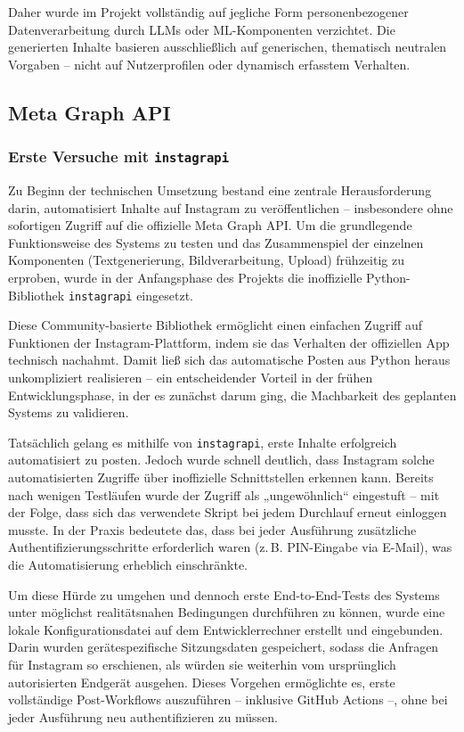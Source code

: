 \documentclass[a4paper,12pt]{article}
\begin{document}
Daher wurde im Projekt vollständig auf jegliche Form personenbezogener Datenverarbeitung durch LLMs oder ML-Komponenten verzichtet. Die generierten Inhalte basieren ausschließlich auf generischen, thematisch neutralen Vorgaben – nicht auf Nutzerprofilen oder dynamisch erfasstem Verhalten.

\subsection{Meta Graph API}

\subsubsection{Erste Versuche mit \texttt{instagrapi}}

Zu Beginn der technischen Umsetzung bestand eine zentrale Herausforderung darin, automatisiert Inhalte auf Instagram zu veröffentlichen – insbesondere ohne sofortigen Zugriff auf die offizielle Meta Graph API. Um die grundlegende Funktionsweise des Systems zu testen und das Zusammenspiel der einzelnen Komponenten (Textgenerierung, Bildverarbeitung, Upload) frühzeitig zu erproben, wurde in der Anfangsphase des Projekts die inoffizielle Python-Bibliothek \texttt{instagrapi} eingesetzt.

Diese Community-basierte Bibliothek ermöglicht einen einfachen Zugriff auf Funktionen der Instagram-Plattform, indem sie das Verhalten der offiziellen App technisch nachahmt. Damit ließ sich das automatische Posten aus Python heraus unkompliziert realisieren – ein entscheidender Vorteil in der frühen Entwicklungsphase, in der es zunächst darum ging, die Machbarkeit des geplanten Systems zu validieren.

Tatsächlich gelang es mithilfe von \texttt{instagrapi}, erste Inhalte erfolgreich automatisiert zu posten. Jedoch wurde schnell deutlich, dass Instagram solche automatisierten Zugriffe über inoffizielle Schnittstellen erkennen kann. Bereits nach wenigen Testläufen wurde der Zugriff als „ungewöhnlich“ eingestuft – mit der Folge, dass sich das verwendete Skript bei jedem Durchlauf erneut einloggen musste. In der Praxis bedeutete das, dass bei jeder Ausführung zusätzliche Authentifizierungsschritte erforderlich waren (z.\,B. PIN-Eingabe via E-Mail), was die Automatisierung erheblich einschränkte.

Um diese Hürde zu umgehen und dennoch erste End-to-End-Tests des Systems unter möglichst realitätsnahen Bedingungen durchführen zu können, wurde eine lokale Konfigurationsdatei auf dem Entwicklerrechner erstellt und eingebunden. Darin wurden gerätespezifische Sitzungsdaten gespeichert, sodass die Anfragen für Instagram so erschienen, als würden sie weiterhin vom ursprünglich autorisierten Endgerät ausgehen. Dieses Vorgehen ermöglichte es, erste vollständige Post-Workflows auszuführen – inklusive GitHub Actions –, ohne bei jeder Ausführung neu authentifizieren zu müssen.
\end{document}
